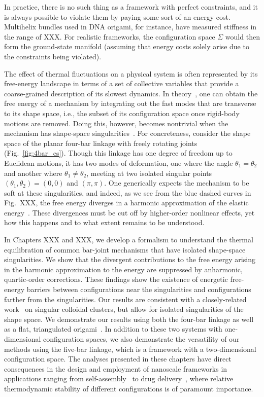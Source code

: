 In practice, there is no such thing as a framework with perfect constraints, and it is always possible to violate them by paying some sort of an energy cost.
Multihelix bundles used in DNA origami, for instance, have measured stiffness in the range of XXX.
For realistic frameworks, the configuration space $\Sigma$ would then form the ground-state manifold (assuming that energy costs solely arise due to the constraints being violated).


The effect of thermal fluctuations on a physical system is often represented by its free-energy landscape in terms of a set of collective variables that provide a coarse-grained description of its slowest dynamics.
In theory~\cite{go1976,echenique2011}, one can obtain the free energy of a mechanism by integrating out the fast modes that are transverse to its shape space, i.e., the subset of its configuration space once rigid-body motions are removed.
Doing this, however, becomes nontrivial when the mechanism has shape-space singularities~\cite{zlatanov2002,liu2003,donelan2007}.
For concreteness, consider the shape space of the planar four-bar linkage with freely rotating joints~\cite{grashof1883,hartenberg1964,shimamoto2005} (Fig.~\ref{fig:4bar_cs}).
Though this linkage has one degree of freedom up to Euclidean motions, it has two modes of deformation, one where the angle $\theta_1 = \theta_2$ and another where $\theta_1 \ne \theta_2$, meeting at two isolated singular points $(\theta_1,\theta_2) = (0,0)$ and $(\pi,\pi)$.
One generically expects the mechanism to be soft at these singularities, and indeed, as we see from the blue dashed curves in Fig.~XXX, the free energy diverges in a harmonic approximation of the elastic energy~\cite{rocklin2018}.
These divergences must be cut off by higher-order nonlinear effects, yet how this happens and to what extent remains to be understood.

In Chapters XXX and XXX, we develop a formalism to understand the thermal equilibration of common bar-joint mechanisms that have isolated shape-space singularities.
We show that the divergent contributions to the free energy arising in the harmonic approximation to the energy are suppressed by anharmonic, quartic-order corrections.
These findings show the existence of energetic free-energy barriers between configurations near the singularities and configurations farther from the singularities.
Our results are consistent with a closely-related work~\cite{kallus2017,holmes-cerfon2017} on singular colloidal clusters, but allow for isolated singularities of the shape space.
We demonstrate our results using both the four-bar linkage as well as a flat, triangulated origami~\cite{chen2018}.
In addition to these two systems with one-dimensional configuration spaces, we also demonstrate the versatility of our methods using the five-bar linkage, which is a framework with a two-dimensional configuration space.
The analyses presented in these chapters have direct consequences in the design and employment of nanoscale frameworks in applications ranging from self-assembly~\cite{liedl2010} to drug delivery~\cite{zhao2019}, where relative thermodynamic stability of different configurations is of paramount importance.

